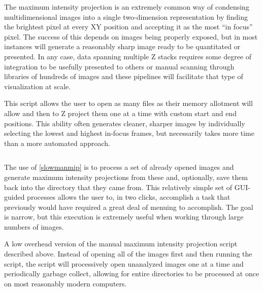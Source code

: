 The maximum intensity projection is an extremely common way of condensing multidimensional images into a single two-dimension representation by finding the brightest pixel at every XY position and accepting it as the most ``in focus'' pixel. The success of this depends on images being properly exposed, but in most instances will generate a reasonably sharp image ready to be quantitated or presented. In any case, data spanning multiple Z stacks requires some degree of integration to be usefully presented to others or manual scanning through libraries of hundreds of images and these pipelines will facilitate that type of visualization at scale.

\begin{code}
\caption{This script allows the user to open as many files as their memory allotment will allow and then to Z project them one at a time with custom start and end positions. This ability often generates cleaner, sharper images by individually selecting the lowest and highest in-focus frames, but necessarily takes more time than a more automated approach.}
\label{slowmanmip}

\inputminted[breaklines,frame=single,fontsize=\small]{python}{source/manMIPper.py}

\end{code}

The use of \autoref{slowmanmip} is to process a set of already opened images and generate maximum intensity projections from these and, optionally, save them back into the directory that they came from. This relatively simple set of GUI-guided processes allows the user to, in two clicks, accomplish a task that previously would have required a great deal of menuing to accomplish. The goal is narrow, but this execution is extremely useful when working through large numbers of images.

\begin{code}
\caption{A low overhead version of the manual maximum intensity projection script described above. Instead of opening all of the images first and then running the script, the script will processively open unanalyzed images one at a time and periodically garbage collect, allowing for entire directories to be processed at once on most reasonably modern computers.}
\label{fastmanmip}

\inputminted[breaklines,frame=single,fontsize=\small]{python}{source/fast_manMIPper.py}

\end{code}

